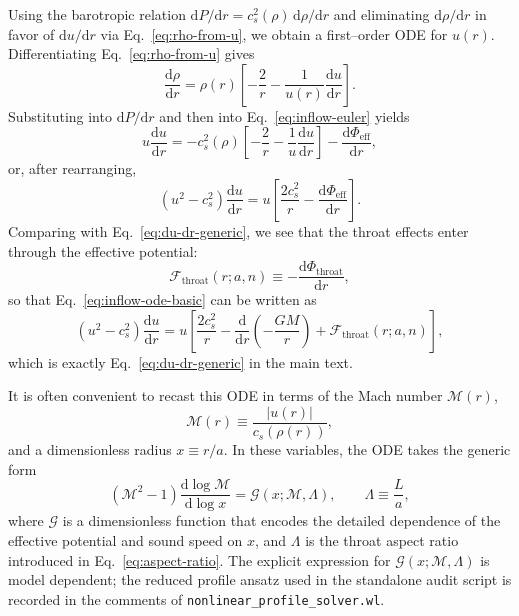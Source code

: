 \documentclass[11pt]{article}
\begin{document}
Using the barotropic relation \(\mathrm{d}P/\mathrm{d}r
= c_s^2(\rho)\,\mathrm{d}\rho/\mathrm{d}r\) and eliminating
\(\mathrm{d}\rho/\mathrm{d}r\) in favor of \(\mathrm{d}u/\mathrm{d}r\) via
Eq.~\eqref{eq:rho-from-u}, we obtain a first--order ODE for \(u(r)\).
Differentiating Eq.~\eqref{eq:rho-from-u} gives
\begin{equation}
  \frac{\mathrm{d}\rho}{\mathrm{d}r}
  = \rho(r)
    \left[
      -\frac{2}{r}
      - \frac{1}{u(r)} \frac{\mathrm{d}u}{\mathrm{d}r}
    \right].
\end{equation}
Substituting into \(\mathrm{d}P/\mathrm{d}r\) and then into
Eq.~\eqref{eq:inflow-euler} yields
\begin{equation}
  u \frac{\mathrm{d}u}{\mathrm{d}r}
  = - c_s^2(\rho)
    \left[
      -\frac{2}{r}
      - \frac{1}{u} \frac{\mathrm{d}u}{\mathrm{d}r}
    \right]
    - \frac{\mathrm{d}\Phi_{\text{eff}}}{\mathrm{d}r},
\end{equation}
or, after rearranging,
\begin{equation}
  \left( u^2 - c_s^2 \right) \frac{\mathrm{d}u}{\mathrm{d}r}
  = u
    \left[
      \frac{2 c_s^2}{r}
      - \frac{\mathrm{d}\Phi_{\text{eff}}}{\mathrm{d}r}
    \right].
  \label{eq:inflow-ode-basic}
\end{equation}
Comparing with Eq.~\eqref{eq:du-dr-generic}, we see that the throat effects
enter through the effective potential:
\begin{equation}
  \mathcal{F}_{\text{throat}}(r; a, n)
  \equiv -\frac{\mathrm{d}\Phi_{\text{throat}}}{\mathrm{d}r},
\end{equation}
so that Eq.~\eqref{eq:inflow-ode-basic} can be written as
\begin{equation}
  \left( u^2 - c_s^2 \right) \frac{\mathrm{d}u}{\mathrm{d}r}
  = u
    \left[
      \frac{2 c_s^2}{r}
      - \frac{\mathrm{d}}{\mathrm{d}r}
        \left( -\frac{G M}{r} \right)
      + \mathcal{F}_{\text{throat}}(r; a, n)
    \right],
\end{equation}
which is exactly Eq.~\eqref{eq:du-dr-generic} in the main text.

It is often convenient to recast this ODE in terms of the Mach number
\(\mathcal{M}(r)\),
\begin{equation}
  \mathcal{M}(r) \equiv \frac{|u(r)|}{c_s(\rho(r))},
\end{equation}
and a dimensionless radius \(x \equiv r/a\).  In these variables, the ODE
takes the generic form
\begin{equation}
  \left( \mathcal{M}^2 - 1 \right)
  \frac{\mathrm{d}\log \mathcal{M}}{\mathrm{d}\log x}
  = \mathcal{G}(x; \mathcal{M}, \Lambda),
  \qquad
  \Lambda \equiv \frac{L}{a},
  \label{eq:Mach-ODE}
\end{equation}
where \(\mathcal{G}\) is a dimensionless function that encodes the detailed
dependence of the effective potential and sound speed on \(x\), and
\(\Lambda\) is the throat aspect ratio introduced in
Eq.~\eqref{eq:aspect-ratio}.  The explicit expression for
\(\mathcal{G}(x; \mathcal{M}, \Lambda)\) is model dependent; the reduced
profile ansatz used in the standalone audit script is recorded in the
comments of \texttt{nonlinear\_profile\_solver.wl}.
\end{document}
